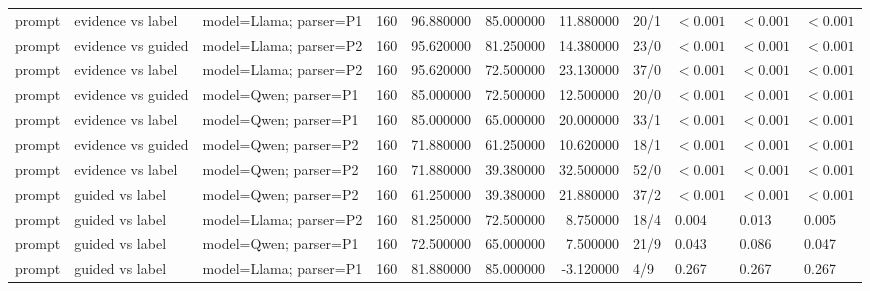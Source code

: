 \begin{table}[t]
\begin{tabular}{lllrrrrllll}
prompt & evidence vs label & model=Llama; parser=P1 & 160 & 96.880000 & 85.000000 & 11.880000 & 20/1 & $<0.001$ & $<0.001$ & $<0.001$ \\
prompt & evidence vs guided & model=Llama; parser=P2 & 160 & 95.620000 & 81.250000 & 14.380000 & 23/0 & $<0.001$ & $<0.001$ & $<0.001$ \\
prompt & evidence vs label & model=Llama; parser=P2 & 160 & 95.620000 & 72.500000 & 23.130000 & 37/0 & $<0.001$ & $<0.001$ & $<0.001$ \\
prompt & evidence vs guided & model=Qwen; parser=P1 & 160 & 85.000000 & 72.500000 & 12.500000 & 20/0 & $<0.001$ & $<0.001$ & $<0.001$ \\
prompt & evidence vs label & model=Qwen; parser=P1 & 160 & 85.000000 & 65.000000 & 20.000000 & 33/1 & $<0.001$ & $<0.001$ & $<0.001$ \\
prompt & evidence vs guided & model=Qwen; parser=P2 & 160 & 71.880000 & 61.250000 & 10.620000 & 18/1 & $<0.001$ & $<0.001$ & $<0.001$ \\
prompt & evidence vs label & model=Qwen; parser=P2 & 160 & 71.880000 & 39.380000 & 32.500000 & 52/0 & $<0.001$ & $<0.001$ & $<0.001$ \\
prompt & guided vs label & model=Qwen; parser=P2 & 160 & 61.250000 & 39.380000 & 21.880000 & 37/2 & $<0.001$ & $<0.001$ & $<0.001$ \\
prompt & guided vs label & model=Llama; parser=P2 & 160 & 81.250000 & 72.500000 & 8.750000 & 18/4 & 0.004 & 0.013 & 0.005 \\
prompt & guided vs label & model=Qwen; parser=P1 & 160 & 72.500000 & 65.000000 & 7.500000 & 21/9 & 0.043 & 0.086 & 0.047 \\
prompt & guided vs label & model=Llama; parser=P1 & 160 & 81.880000 & 85.000000 & -3.120000 & 4/9 & 0.267 & 0.267 & 0.267 \\
\bottomrule
\end{tabular}
\end{table}
